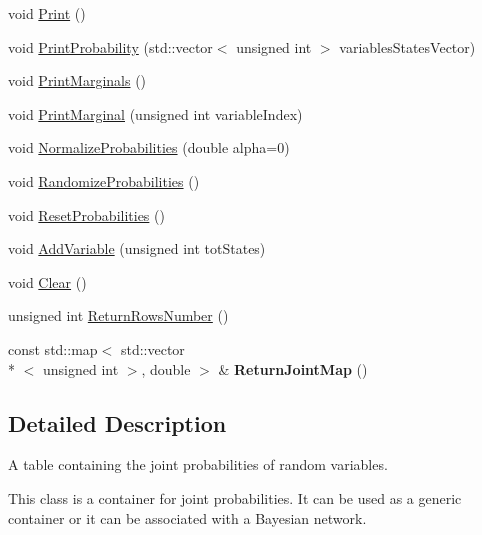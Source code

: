 \begin{DoxyCompactItemize}
\item 
void \hyperlink{classbayonet_1_1_joint_probability_table_ade691120f2a61325b94a7f9e85dd21f8}{Print} ()
\item 
void \hyperlink{classbayonet_1_1_joint_probability_table_ac52835cb75b2d635b51843abf58311a9}{Print\-Probability} (std\-::vector$<$ unsigned int $>$ variables\-States\-Vector)
\item 
void \hyperlink{classbayonet_1_1_joint_probability_table_a73e7e3843c63192e37d11bd9916f0587}{Print\-Marginals} ()
\item 
void \hyperlink{classbayonet_1_1_joint_probability_table_ada1f39508ba6a128d9f0405efe1257a7}{Print\-Marginal} (unsigned int variable\-Index)
\item 
void \hyperlink{classbayonet_1_1_joint_probability_table_a7f89dc909bd3fc68ba0859ce4b6f130c}{Normalize\-Probabilities} (double alpha=0)
\item 
void \hyperlink{classbayonet_1_1_joint_probability_table_a91133b2cf610076459a641b458c898cd}{Randomize\-Probabilities} ()
\item 
void \hyperlink{classbayonet_1_1_joint_probability_table_a1d099395c21a1ec57df4ffbaa1b85484}{Reset\-Probabilities} ()
\item 
void \hyperlink{classbayonet_1_1_joint_probability_table_a34def84ddda0e58303d552055057b884}{Add\-Variable} (unsigned int tot\-States)
\item 
void \hyperlink{classbayonet_1_1_joint_probability_table_a61a82adc62427272e5aa84ace3fc15a6}{Clear} ()
\item 
unsigned int \hyperlink{classbayonet_1_1_joint_probability_table_af87920fcfa20657c2c3eb816a77ea66b}{Return\-Rows\-Number} ()
\item 
\hypertarget{classbayonet_1_1_joint_probability_table_a6172ff11f3cc9e2f6eb0ae42eb3fcb47}{const std\-::map$<$ std\-::vector\\*
$<$ unsigned int $>$, double $>$ \& {\bfseries Return\-Joint\-Map} ()}\label{classbayonet_1_1_joint_probability_table_a6172ff11f3cc9e2f6eb0ae42eb3fcb47}

\end{DoxyCompactItemize}


\subsection{Detailed Description}
A table containing the joint probabilities of random variables. 

This class is a container for joint probabilities. It can be used as a generic container or it can be associated with a Bayesian network. 

